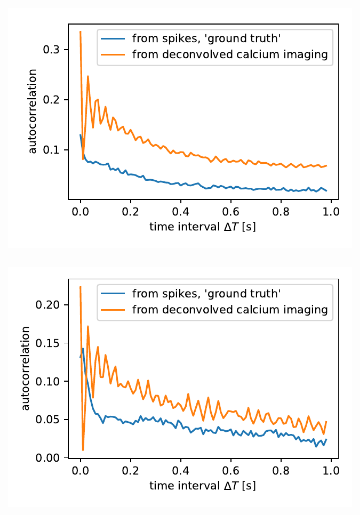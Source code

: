 \documentclass[12pt,a4paper,headinclude]{scrartcl}
\begin{document}
\begin{figure}
\begin{subfigure}{.5\textwidth}
  \centering
  \includegraphics[width=1\linewidth]{./figures/comparison1.pdf}
\end{subfigure}%
\begin{subfigure}{.5\textwidth}
  \centering
  \includegraphics[width=1\linewidth]{./figures/comparison2.pdf}
\end{subfigure}%


\end{figure}
\end{document}

